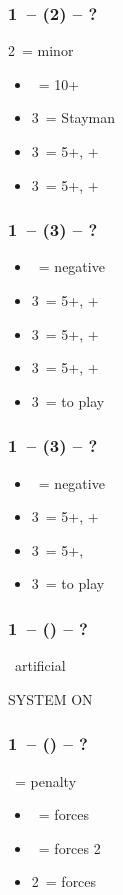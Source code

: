 \documentclass[12pt, a4paper]{article}
\begin{document}
\subsubsection*{1\ntx\ -- (2\nt\alrts) -- ?}
2\nt\ = minor
\begin{itemize}
    \item \dbl\ = 10+
    \item 3\clubs\ = Stayman
    \item 3\diams\ = 5+\hearts, \inv+
    \item 3\hearts\ = 5+\spades, \inv+
\end{itemize}

\subsubsection*{1\ntx\ -- (3\clubs) -- ?}
\begin{itemize}
    \item \dbl\ = negative
    \item 3\diams\ = 5+\hearts, \inv+
    \item 3\hearts\ = 5+\spades, \inv+
    \item 3\spades\ = 5+\diams, \inv+
    \item 3\nt\ = to play
\end{itemize}

\subsubsection*{1\ntx\ -- (3\diams) -- ?}
\begin{itemize}
    \item \dbl\ = negative
    \item 3\hearts\ = 5+\spades, \inv+
    \item 3\spades\ = 5+\hearts, \gf
    \item 3\nt\ = to play
\end{itemize}

\subsubsection*{1\ntx\ -- (\dbl\alrts) -- ?}
\dbl\ artificial

SYSTEM ON


\subsubsection*{1\ntx\ -- (\dbl) -- ?}
\dbl\ = penalty
\begin{itemize}
    \item \pass\ = forces \rdbl
    \item \rdbl\ = forces 2\clubs
    \item 2\ = forces 
\end{itemize}
\end{document}
